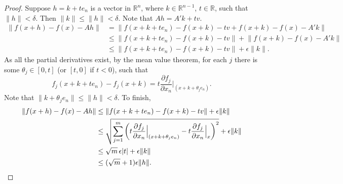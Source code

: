 \documentclass[12pt,openany]{book}
\newcommand{\sabs}[1]{\lvert {#1} \rvert}
\newcommand{\snorm}[1]{\lVert {#1} \rVert}
\newcommand{\R}{{\mathbb{R}}}
\theoremstyle{plain}
\theoremstyle{remark}
\theoremstyle{definition}
\theoremstyle{exercise}
\theoremstyle{example}
\begin{document}
\begin{proof}
Suppose $h = k + t e_n$ is a vector in $\R^n$, where $k \in \R^{n-1}$, $t
\in \R$, such that
$\snorm{h} < \delta$.  Then $\snorm{k} \leq \snorm{h} < \delta$.
Note that $Ah = A' k + tv$.
\begin{equation*}
\begin{split}
\snorm{f(x+h) - f(x) - Ah}
& = \snorm{f(x+k + t e_n) - f(x+k) - tv + f(x+k) - f(x) - A' k}
\\
& \leq \snorm{f(x+k + t e_n) - f(x+k) -tv} + \snorm{f(x+k) - f(x) -
A' k}
\\
& \leq \snorm{f(x+k + t e_n) - f(x+k) -tv} + \epsilon \snorm{k} .
\end{split}
\end{equation*}
As all the partial derivatives exist, by the mean value theorem,
for each $j$ there is some $\theta_j \in [0,t]$ (or $[t,0]$ if $t < 0$), such that
\begin{equation*}
f_j(x+k + t e_n) - f_j(x+k) =
t \frac{\partial f_j}{\partial x_n}\Big|_{(x+k+\theta_j e_n)}.
\end{equation*}
Note that $\snorm{k+\theta_j e_n} \leq \snorm{h} < \delta$.
To finish,
\begin{equation*}
\begin{split}
\snorm{f(x+h) - f(x) - Ah}
& \leq \snorm{f(x+k + t e_n) - f(x+k) -tv} + \epsilon \snorm{k}
\\
& \leq \sqrt{\sum_{j=1}^m
{\left(t\frac{\partial f_j}{\partial x_n}\Big|_{(x+k+\theta_j e_n)} -
t \frac{\partial f_j}{\partial x_n}\Big|_{x}\right)}^2} + \epsilon \snorm{k}
\\
& \leq \sqrt{m}\, \epsilon \sabs{t} + \epsilon \snorm{k}
\\
& \leq (\sqrt{m}+1)\epsilon \snorm{h} . \qedhere
\end{split}
\end{equation*}
\end{proof}
\end{document}
